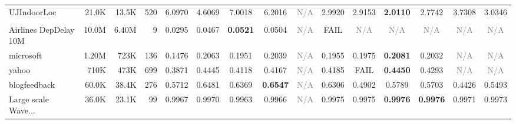 \begin{table}[t]
{\begin{tabular}{lrrrccccccccccc}
UJIndoorLoc & 21.0K & 13.5K & 520 & \cellcolor[HTML]{F8DACC}6.0970 & \cellcolor[HTML]{FFF0CC}4.6069 & \cellcolor[HTML]{F4CCCC}7.0018 & \cellcolor[HTML]{F8D8CC}6.2016 & \textcolor{gray}{N/A} & \cellcolor[HTML]{E8EDD0}2.9920 & \cellcolor[HTML]{E7EDD0}2.9153 & \cellcolor[HTML]{D9EAD3}\textbf{2.0110} & \cellcolor[HTML]{E5ECD1}2.7742 & \cellcolor[HTML]{F3F0CE}3.7308 & \cellcolor[HTML]{E9EDD0}3.0346 \\
\addlinespace[2pt]
\rowcolor{gray!15}
\multicolumn{15}{l}{\textbf{$R^2$}} \\
Airlines DepDelay 10M & 10.0M & 6.40M & 9 & \cellcolor[HTML]{F4CCCC}0.0295 & \cellcolor[HTML]{EBEED0}0.0467 & \cellcolor[HTML]{D9EAD3}\textbf{0.0521} & \cellcolor[HTML]{DFEBD2}0.0504 & \textcolor{gray}{N/A} & \textcolor{red!70!black}{FAIL} & \textcolor{gray}{N/A} & \textcolor{gray}{N/A} & \textcolor{gray}{N/A} & \textcolor{gray}{N/A} & \textcolor{gray}{N/A} \\
microsoft & 1.20M & 723K & 136 & \cellcolor[HTML]{F4CCCC}0.1476 & \cellcolor[HTML]{DBEAD3}0.2063 & \cellcolor[HTML]{E9EDD0}0.1951 & \cellcolor[HTML]{DEEBD2}0.2039 & \textcolor{gray}{N/A} & \cellcolor[HTML]{E9EDD0}0.1955 & \cellcolor[HTML]{E6EDD1}0.1975 & \cellcolor[HTML]{D9EAD3}\textbf{0.2081} & \cellcolor[HTML]{DFEBD2}0.2032 & \textcolor{gray}{N/A} & \textcolor{gray}{N/A} \\
yahoo & 710K & 473K & 699 & \cellcolor[HTML]{F4CCCC}0.3871 & \cellcolor[HTML]{DAEAD3}0.4445 & \cellcolor[HTML]{FDECCC}0.4118 & \cellcolor[HTML]{FEF2CC}0.4167 & \textcolor{gray}{N/A} & \cellcolor[HTML]{FCF1CD}0.4185 & \textcolor{red!70!black}{FAIL} & \cellcolor[HTML]{D9EAD3}\textbf{0.4450} & \cellcolor[HTML]{EEEECF}0.4293 & \textcolor{gray}{N/A} & \textcolor{gray}{N/A} \\
blogfeedback & 60.0K & 38.4K & 276 & \cellcolor[HTML]{F7F0CD}0.5712 & \cellcolor[HTML]{DBEAD3}0.6481 & \cellcolor[HTML]{DFEBD2}0.6369 & \cellcolor[HTML]{D9EAD3}\textbf{0.6547} & \textcolor{gray}{N/A} & \cellcolor[HTML]{E2ECD1}0.6306 & \cellcolor[HTML]{F9DDCC}0.4902 & \cellcolor[HTML]{F4F0CE}0.5789 & \cellcolor[HTML]{F7F0CD}0.5703 & \cellcolor[HTML]{F4CCCC}0.4426 & \cellcolor[HTML]{FFF2CC}0.5493 \\
Large scale Wave... & 36.0K & 23.1K & 99 & \cellcolor[HTML]{FBE3CC}0.9967 & \cellcolor[HTML]{FCF1CD}0.9970 & \cellcolor[HTML]{F4CCCC}0.9963 & \cellcolor[HTML]{F9DECC}0.9966 & \textcolor{gray}{N/A} & \cellcolor[HTML]{DFEBD2}0.9975 & \cellcolor[HTML]{DFEBD2}0.9975 & \cellcolor[HTML]{D9EAD3}\textbf{0.9976} & \cellcolor[HTML]{D9EAD3}\textbf{0.9976} & \cellcolor[HTML]{F6F0CE}0.9971 & \cellcolor[HTML]{EBEED0}0.9973 \\

\end{tabular}}
\end{table}
